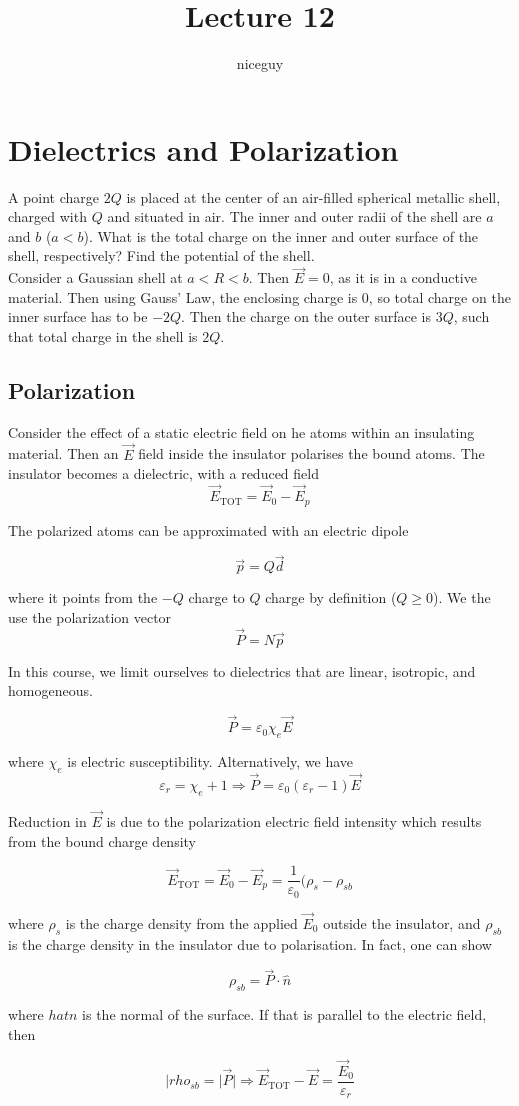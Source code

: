 \documentclass[12pt]{article}
\author{niceguy}
\title{Lecture 12}
\begin{document}
\maketitle

\section{Dielectrics and Polarization}

\begin{ex}
	A point charge $2Q$ is placed at the center of an air-filled spherical metallic shell, charged with $Q$ and situated in air. The inner and outer radii of the shell are $a$ and $b$ ($a<b$). What is the total charge on the inner and outer surface of the shell, respectively? Find the potential of the shell. \\
	Consider a Gaussian shell at $a < R < b$. Then $\vec{E} = 0$, as it is in a conductive material. Then using Gauss' Law, the enclosing charge is 0, so total charge on the inner surface has to be $-2Q$. Then the charge on the outer surface is $3Q$, such that total charge in the shell is $2Q$.
\end{ex}

\subsection{Polarization}

Consider the effect of a static electric field on he atoms within an insulating material. Then an $\vec{E}$ field inside the insulator polarises the bound atoms. The insulator becomes a dielectric, with a reduced field
$$\vec{E}_{\text{TOT}} = \vec{E}_0 - \vec{E}_p$$

The polarized atoms can be approximated with an electric dipole

$$\vec{p} = Q\vec{d}$$

where it points from the $-Q$ charge to $Q$ charge by definition ($Q\geq0$). We the use the polarization vector
$$\vec{P} = N\vec{p}$$

In this course, we limit ourselves to dielectrics that are linear, isotropic, and homogeneous.

$$\vec{P} = \varepsilon_0 \chi_e \vec{E}$$

where $\chi_e$ is electric susceptibility. Alternatively, we have
$$\varepsilon_r = \chi_e + 1 \Rightarrow \vec{P} = \varepsilon_0(\varepsilon_r - 1)\vec{E}$$

Reduction in $\vec{E}$ is due to the polarization electric field intensity which results from the bound charge density

$$\vec{E}_{\text{TOT}} = \vec{E}_0 - \vec{E}_p = \frac{1}{\varepsilon_0} (\rho_s - \rho_{sb}$$

where $\rho_s$ is the charge density from the applied $\vec{E}_0$ outside the insulator, and $\rho_{sb}$ is the charge density in the insulator due to polarisation. In fact, one can show

$$\rho_{sb} = \vec{P}\cdot\hat{n}$$

where $hat{n}$ is the normal of the surface. If that is parallel to the electric field, then

$$|rho_{sb} = |\vec{P}| \Rightarrow \vec{E}_{\text{TOT}} - \vec{E} = \frac{\vec{E}_0}{\varepsilon_r}$$
\end{document}
